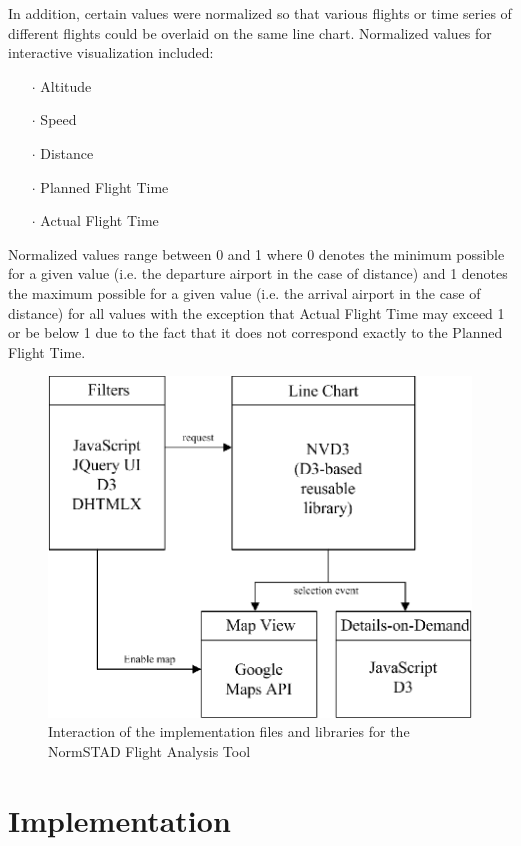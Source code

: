 \documentclass{sig-alternate}
\begin{document}
In addition, certain values were normalized
so that various flights or time series of different
flights could be overlaid on the same line chart.
Normalized values for interactive visualization
included:
\begin{itemize}
\item[$\cdot$] Altitude
\item[$\cdot$] Speed
\item[$\cdot$] Distance
\item[$\cdot$] Planned Flight Time 
\item[$\cdot$] Actual Flight Time
\end{itemize}

Normalized values range between 0 and 1
where 0 denotes the minimum possible for a given value (i.e. the departure airport
in the case of distance) and 1 denotes the maximum possible 
for a given value (i.e. the arrival airport in the case of distance) 
for all values with the exception that Actual Flight Time may
exceed 1 or be below 1 due to the fact that it does not correspond exactly 
to the Planned Flight Time.

\begin{figure}
\centering
\includegraphics[width=\columnwidth]{figs/arch.eps}
\caption{
	Interaction of the implementation files and libraries for the NormSTAD Flight Analysis Tool}
\label{arch}
\end{figure}

\section{Implementation}
\label{sec-architecture}
\end{document}
